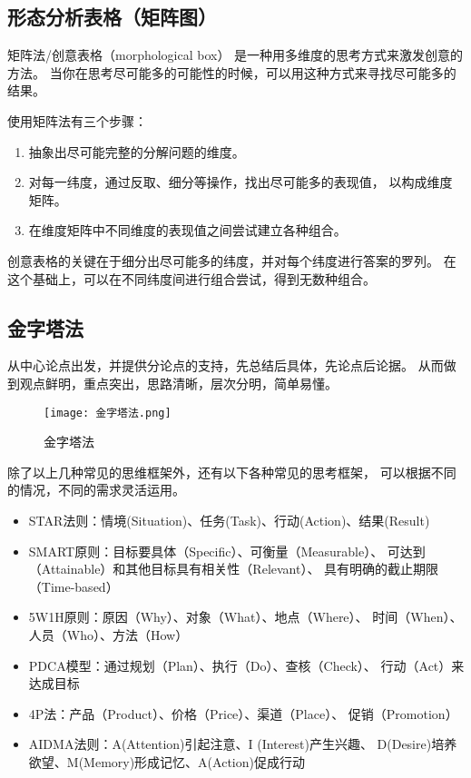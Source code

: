 \documentclass[../main.tex]{subfiles}
\begin{document}
\subsection{形态分析表格（矩阵图）}
矩阵法/创意表格（morphological box）
是一种用多维度的思考方式来激发创意的方法。
当你在思考尽可能多的可能性的时候，可以用这种方式来寻找尽可能多的结果。

使用矩阵法有三个步骤：
\begin{enumerate}
  \item 抽象出尽可能完整的分解问题的维度。
  \item 对每一纬度，通过反取、细分等操作，找出尽可能多的表现值，
    以构成维度矩阵。
  \item 在维度矩阵中不同维度的表现值之间尝试建立各种组合。
\end{enumerate}

创意表格的关键在于细分出尽可能多的纬度，并对每个纬度进行答案的罗列。
在这个基础上，可以在不同纬度间进行组合尝试，得到无数种组合。
%
\subsection{金字塔法}
从中心论点出发，并提供分论点的支持，先总结后具体，先论点后论据。
从而做到观点鲜明，重点突出，思路清晰，层次分明，简单易懂。
%
\begin{figure}[H]
  \begin{center}
    \texttt{[image: 金字塔法.png]}
  \end{center}
  \caption{金字塔法}
\end{figure}
%

除了以上几种常见的思维框架外，还有以下各种常见的思考框架，
可以根据不同的情况，不同的需求灵活运用。
%
\begin{itemize}
  \item STAR法则：情境(Situation)、任务(Task)、行动(Action)、结果(Result)
  \item SMART原则：目标要具体（Specific）、可衡量（Measurable）、
    可达到（Attainable）和其他目标具有相关性（Relevant）、
    具有明确的截止期限（Time-based）
  \item 5W1H原则：原因（Why）、对象（What）、地点（Where）、
    时间（When）、人员（Who）、方法（How）
  \item PDCA模型：通过规划（Plan）、执行（Do）、查核（Check）、
    行动（Act）来达成目标
  \item 4P法：产品（Product）、价格（Price）、渠道（Place）、
    促销（Promotion）
  \item AIDMA法则：A(Attention)引起注意、I (Interest)产生兴趣、
    D(Desire)培养欲望、M(Memory)形成记忆、A(Action)促成行动
\end{itemize}
%
%
\end{document}
